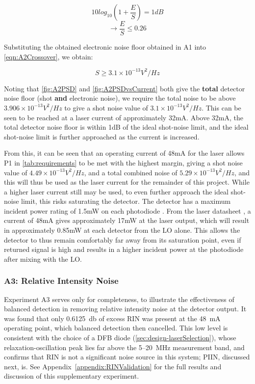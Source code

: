 \begin{equation}
    10log_{10}(1+\frac{E}{S})=1dB
\end{equation}
\begin{equation}
    \xrightarrow{}\frac{E}{S}\leq0.26
    \label{eqn:A2Crossover}
\end{equation}

Substituting the obtained electronic noise floor obtained in A1 into \autoref{eqn:A2Crossover}, we obtain:

\begin{equation}
    S \geq 3.1 \times 10^{-13}V^2/Hz
\end{equation}

Noting that \autoref{fig:A2PSD} and \autoref{fig:A2PSDvsCurrent} both give the \textbf{total} detector noise floor (shot \textbf{and} electronic noise), we require the total noise to be above $3.906 \times 10^{-13}V^2/Hz$ to give a shot noise value of $3.1 \times 10^{-13}V^2/Hz$. This can be seen to be reached at a laser current of approximately 32mA. Above 32mA, the total detector noise floor is within 1dB of the ideal shot-noise limit, and the ideal shot-noise limit is further approached as the current is increased. 

From this, it can be seen that an operating current of 48mA for the laser allows P1 in \autoref{tab:requirements} to be met with the highest margin, giving a shot noise value of $4.49\times 10^{-13}V^2/Hz$, and a total combined noise of $5.29\times 10^{-13}V^2/Hz$, and this will thus be used as the laser current for the remainder of this project. While a higher laser current still may be used, to even further approach the ideal shot-noise limit, this risks saturating the detector. The detector has a maximum incident power rating of 1.5mW on each photodiode \cite{detector  datasheet}. From the laser datasheet \cite{laser datasheet}, a current of 48mA gives approximately 17mW at the laser output, which will result in approximately 0.85mW at each detector from the LO alone. This allows the detector to thus remain comfortably far away from its saturation point, even if returned signal is high and results in a higher incident power at the photodiode after mixing with the LO. 

\subsubsection{A3: Relative Intensity Noise}
Experiment A3 serves only for completeness, to illustrate the effectiveness of balanced detection in removing relative intensity noise at the detector output. It was found that only \SI{0.6125}{\decibel} of excess RIN was present at the \SI{48}{\milli\ampere} operating point, which balanced detection then cancelled. This low level is consistent with the choice of a DFB diode (\autoref{sec:design-laserSelection}), whose relaxation-oscillation peak lies far above the 5--\SI{20}{\mega\hertz} measurement band, and confirms that RIN is not a significant noise source in this system; PIIN, discussed next, is. See Appendix~\ref{appendix:RINValidation} for the full results and discussion of this supplementary experiment.

